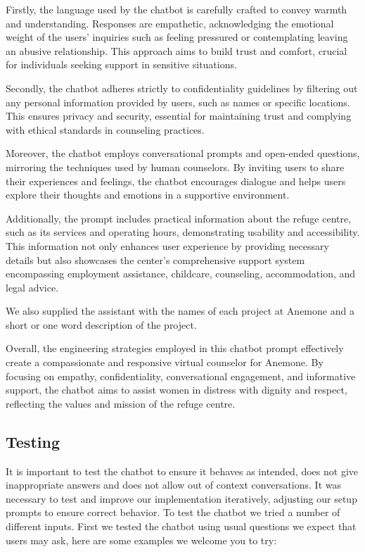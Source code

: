 Firstly, the language used by the chatbot is carefully crafted to convey warmth and understanding. Responses are empathetic, acknowledging the emotional weight of the users' inquiries such as feeling pressured or contemplating leaving an abusive relationship. This approach aims to build trust and comfort, crucial for individuals seeking support in sensitive situations.

Secondly, the chatbot adheres strictly to confidentiality guidelines by filtering out any personal information provided by users, such as names or specific locations. This ensures privacy and security, essential for maintaining trust and complying with ethical standards in counseling practices.

Moreover, the chatbot employs conversational prompts and open-ended questions, mirroring the techniques used by human counselors. By inviting users to share their experiences and feelings, the chatbot encourages dialogue and helps users explore their thoughts and emotions in a supportive environment.

Additionally, the prompt includes practical information about the refuge centre, such as its services and operating hours, demonstrating usability and accessibility. This information not only enhances user experience by providing necessary details but also showcases the center's comprehensive support system encompassing employment assistance, childcare, counseling, accommodation, and legal advice.

We also supplied the assistant with the names of each project at Anemone and a short or one word description of the project.

Overall, the engineering strategies employed in this chatbot prompt effectively create a compassionate and responsive virtual counselor for Anemone. By focusing on empathy, confidentiality, conversational engagement, and informative support, the chatbot aims to assist women in distress with dignity and respect, reflecting the values and mission of the refuge centre.



\subsection{Testing}

It is important to test the chatbot to ensure it behaves as intended, does not give inappropriate answers and does not allow out of context conversations.
It was necessary to test and improve our implementation iteratively, adjusting our setup prompts to ensure correct behavior. 
To test the chatbot we tried a number of different inputs. 
First we tested the chatbot using usual questions we expect that users may ask, here are some examples we welcome you to try:


